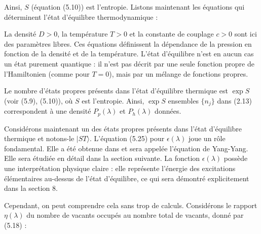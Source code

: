 Ainsi, \( S \) (équation (5.10)) est l'entropie. Listons maintenant les équations qui déterminent l'état d'équilibre thermodynamique :


La densité \( D > 0 \), la température \( T > 0 \) et la constante de couplage \( c > 0 \) sont ici des paramètres libres. Ces équations définissent la dépendance de la pression en fonction de la densité et de la température. L'état d'équilibre n'est en aucun cas un état purement quantique : il n'est pas décrit par une seule fonction propre de l'Hamiltonien (comme pour \( T = 0 \)), mais par un mélange de fonctions propres. 

Le nombre d'états propres présents dans l'état d'équilibre thermique est \( \exp S \) (voir (5.9), (5.10)), où \( S \) est l'entropie. Ainsi, \( \exp S \) ensembles \( \{n_j\} \) dans (2.13) correspondent à une densité \( P_p(\lambda) \) et \( P_h(\lambda) \) données.

Considérons maintenant un des états propres présents dans l'état d'équilibre thermique et notons-le \( |ST\rangle \). L'équation (5.25) pour \( \epsilon(\lambda) \) joue un rôle fondamental. Elle a été obtenue dans \cite{YangYang1969} et sera appelée l'équation de Yang-Yang. Elle sera étudiée en détail dans la section suivante. La fonction \( \epsilon(\lambda) \) possède une interprétation physique claire : elle représente l'énergie des excitations élémentaires au-dessus de l'état d'équilibre, ce qui sera démontré explicitement dans la section 8.

Cependant, on peut comprendre cela sans trop de calculs. Considérons le rapport \( \eta(\lambda) \) du nombre de vacants occupés au nombre total de vacants, donné par (5.18) :







